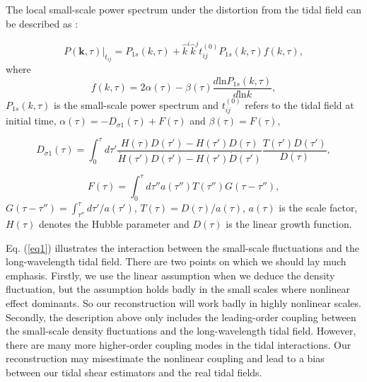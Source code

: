 \documentclass[aps,prd,twocolumn,showpacs,superscriptaddress,groupedaddress,nofootinbib]{revtex4}  %
\begin{document}
The local small-scale power spectrum under the distortion from the tidal field can be described as \cite{2016PhRvD..93j3504Z}:

\begin{equation}
P(\bm{k},\tau)|_{t_{ij}} = P_{1s}(k,\tau)+\hat{k}^i\hat{k}^jt_{ij}^{(0)}P_{1s}(k,\tau)f(k,\tau),
\label{eq1}
\end{equation}
where 
\begin{equation}
f(k,\tau) = 2\alpha(\tau) - \beta(\tau)\frac{d\mathrm{ln}P_{1s}(k,\tau)}{d\mathrm{ln}k},
\label{eq2}
\end{equation}
$P_{1s}(k,\tau)$ is the small-scale power spectrum and $t^{(0)}_{ij}$ refers to the tidal field at initial time,  $\alpha(\tau) = -D_{\sigma1}(\tau) + F(\tau)$ and $\beta(\tau) = F(\tau)$, 

\begin{equation}
D_{\sigma1}(\tau) = \int_{0}^{\tau}d\tau'\frac{H(\tau)D(\tau') - H(\tau')D(\tau)}{\dot{H}(\tau')D(\tau') - H(\tau')\dot{D}(\tau')}\frac{T(\tau')D{(\tau')}}{D(\tau)},
\label{eq3}
\end{equation}

\begin{equation}
F(\tau)=\int_{0}^{\tau}d\tau''a(\tau'')T(\tau'')G(\tau-\tau''),
\label{eq4}
\end{equation}
$G(\tau -\tau'')=\int_{\tau''}^{\tau}d\tau'/a(\tau')$, $T(\tau) = D(\tau)/a(\tau)$, $a(\tau)$ is the scale factor, $H(\tau)$ denotes the Hubble parameter and $D(\tau)$ is the linear growth function. 

Eq. (\ref{eq1}) illustrates the interaction between the small-scale fluctuations and the long-wavelength tidal field. There are two points on which we should lay much emphasis. 
Firstly, we use the linear assumption when we deduce the density fluctuation, but the assumption holds badly in the small scales where nonlinear effect dominants. So our reconstruction will work badly in highly nonlinear scales. Secondly, the description above only includes the leading-order coupling between the small-scale density fluctuations and the long-wavelength tidal field. However, there are many more higher-order coupling modes in the tidal interactions. Our reconstruction may misestimate the nonlinear coupling and lead to a bias between our tidal shear estimators and the real tidal fields.

\end{document}
